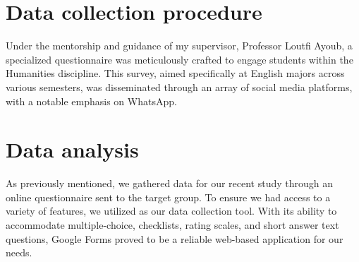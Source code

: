 




\section{Data collection procedure}
Under the mentorship and guidance of my supervisor, Professor Loutfi Ayoub,
a specialized questionnaire was meticulously crafted to engage students within
the Humanities discipline. This survey, aimed specifically at English majors
across various semesters, was disseminated through an array
of social media platforms, with a notable emphasis on WhatsApp.
\section{Data analysis}

As previously mentioned, we gathered data for our recent study through an online questionnaire
sent to the target group. To ensure we had access to a variety of features, we utilized
 as our data collection tool. With its ability to accommodate multiple-choice,
checklists, rating scales, and short answer text questions, Google Forms proved to be a
reliable web-based application for our needs.
